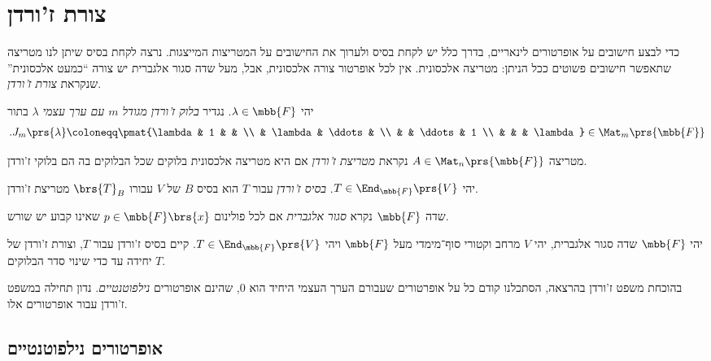 \documentclass[a4paper,10pt,twoside,openany]{book}
\begin{document}
\chapter{צורת ז'ורדן}

כדי לבצע חישובים על אופרטורים לינאריים, בדרך כלל יש לקחת בסיס ולערוך את החישובים על המטריצות המייצגות.
נרצה לקחת בסיס שיתן לנו מטריצה שתאפשר חישובים פשוטים ככל הניתן: מטריצה אלכסונית. אין לכל אופרטור צורה אלכסונית, אבל, מעל שדה סגור אלגברית יש צורה
``כמעט אלכסונית'' שנקראת
\emph{צורת ז'ורדן}.

\begin{definition}
יהי
$\lambda \in \mbb{F}$.
נגדיר
\emph{בלוק ז'ורדן מגודל
$m$
עם ערך עצמי
$\lambda$}
בתור
\begin{align*}
\text{.} J_m\prs{\lambda} \coloneqq \pmat{\lambda & 1 & & \\ & \lambda & \ddots & \\ & & \ddots & 1 \\ & & & \lambda} \in \Mat_m\prs{\mbb{F}}
\end{align*}
\end{definition}

\begin{definition}
מטריצה
$A \in \Mat_n\prs{\mbb{F}}$
נקראת
\emph{מטריצת ז'ורדן}
אם היא מטריצה אלכסונית בלוקים שכל הבלוקים בה הם בלוקי ז'ורדן.
\end{definition}

\begin{definition}
יהי
$T \in \End_{\mbb{F}}\prs{V}$.
\emph{בסיס ז'ורדן}
עבור
$T$
הוא בסיס
$B$
של
$V$
עבורו
$\brs{T}_B$
מטריצת ז'ורדן.
\end{definition}

\begin{definition}
שדה
$\mbb{F}$
נקרא
\emph{סגור אלגברית}
אם לכל פולינום
$p \in \mbb{F}\brs{x}$
שאינו קבוע יש שורש.
\end{definition}

\begin{theorem}
יהי
$\mbb{F}$
שדה סגור אלגברית, יהי
$V$
מרחב וקטורי סוף־מימדי מעל
$\mbb{F}$
ויהי
$T \in \End_{\mbb{F}}\prs{V}$.
קיים בסיס ז'ורדן עבור
$T$,
וצורת ז'ורדן של
$T$
יחידה עד כדי שינוי סדר הבלוקים.
\end{theorem}

בהוכחת משפט ז'ורדן בהרצאה, הסתכלנו קודם כל על אופרטורים שעבורם הערך העצמי היחיד הוא
$0$,
שהינם אופרטורים
\emph{נילפוטנטיים}.
נדון תחילה במשפט ז'ורדן עבור אופרטורים אלו.

\section{אופרטורים נילפוטנטיים}
\end{document}
